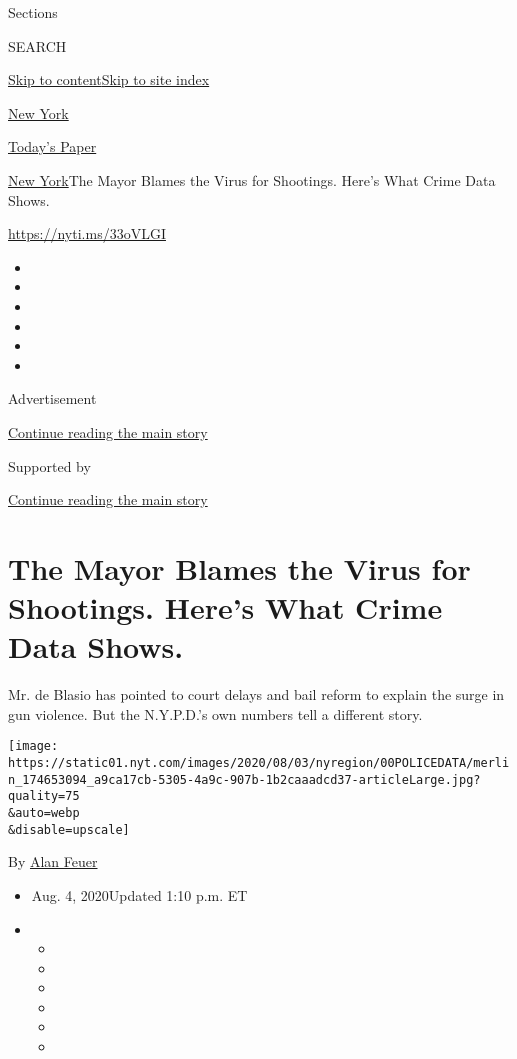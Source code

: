Sections

SEARCH

\protect\hyperlink{site-content}{Skip to
content}\protect\hyperlink{site-index}{Skip to site index}

\href{https://www.nytimes.com/section/nyregion}{New York}

\href{https://myaccount.nytimes.com/auth/login?response_type=cookie\&client_id=vi}{}

\href{https://www.nytimes.com/section/todayspaper}{Today's Paper}

\href{/section/nyregion}{New York}\textbar{}The Mayor Blames the Virus
for Shootings. Here's What Crime Data Shows.

\url{https://nyti.ms/33oVLGI}

\begin{itemize}
\item
\item
\item
\item
\item
\item
\end{itemize}

Advertisement

\protect\hyperlink{after-top}{Continue reading the main story}

Supported by

\protect\hyperlink{after-sponsor}{Continue reading the main story}

\hypertarget{the-mayor-blames-the-virus-for-shootings-heres-what-crime-data-shows}{%
\section{The Mayor Blames the Virus for Shootings. Here's What Crime
Data
Shows.}\label{the-mayor-blames-the-virus-for-shootings-heres-what-crime-data-shows}}

Mr. de Blasio has pointed to court delays and bail reform to explain the
surge in gun violence. But the N.Y.P.D.'s own numbers tell a different
story.

\texttt{[image: https://static01.nyt.com/images/2020/08/03/nyregion/00POLICEDATA/merlin\_174653094\_a9ca17cb-5305-4a9c-907b-1b2caaadcd37-articleLarge.jpg?quality=75\\\&auto=webp\\\&disable=upscale]}

By \href{https://www.nytimes.com/by/alan-feuer}{Alan Feuer}

\begin{itemize}
\item
  Aug. 4, 2020Updated 1:10 p.m. ET
\item
  \begin{itemize}
  \item
  \item
  \item
  \item
  \item
  \item
  \end{itemize}
\end{itemize}

